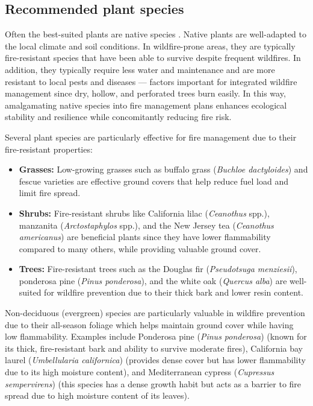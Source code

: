 \documentclass[
  12 pt,
]{Nemilov}
\begin{document}
\subsection{Recommended plant species}\label{recommended-plant-species}

Often the best-suited plants are native species \citep{zouhar2008wildland}. Native plants are well-adapted to the local climate and soil conditions. In wildfire-prone areas, they are typically fire-resistant species that have been able to survive despite frequent wildfires. In addition, they typically require less water and maintenance and are more resistant to local pests and diseases --- factors important for integrated wildfire management since dry, hollow, and perforated trees burn easily. In this way, amalgamating native species into fire management plans enhances ecological stability and resilience while concomitantly reducing fire risk.

Several plant species are particularly effective for fire management due to their fire-resistant properties:

\begin{itemize}
\item
  \textbf{Grasses:} Low-growing grasses such as buffalo grass (\emph{Buchloe dactyloides}) and fescue varieties are effective ground covers that help reduce fuel load and limit fire spread.
\item
  \textbf{Shrubs:} Fire-resistant shrubs like California lilac (\emph{Ceanothus} spp.), manzanita (\emph{Arctostaphylos} spp.), and the New Jersey tea (\emph{Ceanothus americanus}) are beneficial plants since they have lower flammability compared to many others, while providing valuable ground cover.
\item
  \textbf{Trees:} Fire-resistant trees such as the Douglas fir (\emph{Pseudotsuga menziesii}), ponderosa pine (\emph{Pinus ponderosa}), and the white oak (\emph{Quercus alba}) are well-suited for wildfire prevention due to their thick bark and lower resin content.
\end{itemize}

Non-deciduous (evergreen) species are particularly valuable in wildfire prevention due to their all-season foliage which helps maintain ground cover while having low flammability. Examples include Ponderosa pine (\emph{Pinus ponderosa}) (known for its thick, fire-resistant bark and ability to survive moderate fires), California bay laurel (\emph{Umbellularia californica}) (provides dense cover but has lower flammability due to its high moisture content), and Mediterranean cypress (\emph{Cupressus sempervirens}) (this species has a dense growth habit but acts as a barrier to fire spread due to high moisture content of its leaves).
\end{document}
